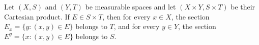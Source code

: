 Let $(X, S)$ and $(Y, T)$ be measurable spaces and let $(X \times Y, S \times T)$ be their Cartesian product. If $E \in S \times T$, then for every $x \in X$, the section $E_x = \{ y : (x,y) \in E \}$ belongs to $T$, and for every $y \in Y$, the section $E^y = \{ x : (x,y) \in E \}$ belongs to $S$.
